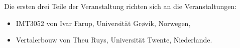 \documentclass{scrartcl}
\begin{document}
  Die ersten drei Teile der Veranstaltung richten sich an die Veranstaltungen:
  
  \begin{itemize}
    \item IMT3052 von Ivar Farup, Universität Grøvik, Norwegen,
    \item Vertalerbouw von Theu Ruys, Universität Twente, Niederlande.
  \end{itemize}
  
  
\end{document}
